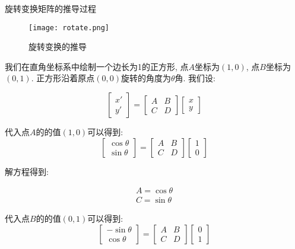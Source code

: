 \documentclass[openany]{progbookcn}
\begin{document}
\begin{titledbox}{旋转变换矩阵的推导过程}
	\begin{figure}[H]
		\centering
		\texttt{[image: rotate.png]}
		\caption{旋转变换的推导}
		\label{fig:shear}
	\end{figure}

我们在直角坐标系中绘制一个边长为1的正方形, 点$A$坐标为$(1,0)$, 点$B$坐标为$(0,1)$. 正方形沿着原点$(0,0)$旋转的角度为$\theta$角. 我们设: 

\begin{equation}
	\begin{bmatrix}x'\\y'\end{bmatrix}=\begin{bmatrix}A&B\\C&D\end{bmatrix}\begin{bmatrix}x\\y\end{bmatrix}
\end{equation}

代入点$A$的的值$(1,0)$可以得到: 
\begin{equation}
	\begin{bmatrix}\cos\theta\\\sin\theta\end{bmatrix}=\begin{bmatrix}A&B\\C&D\end{bmatrix}\begin{bmatrix}1\\0\end{bmatrix}
\end{equation}

解方程得到: 

\begin{equation}
\begin{split}
	A=\cos\theta\\C=\sin\theta
\end{split}
\end{equation}

代入点$B$的的值$(0,1)$可以得到: 
\begin{equation}
	\begin{bmatrix}-\sin\theta\\\cos\theta\end{bmatrix}=\begin{bmatrix}A&B\\C&D\end{bmatrix}\begin{bmatrix}0\\1\end{bmatrix}
\end{equation}


\end{titledbox}
\end{document}
